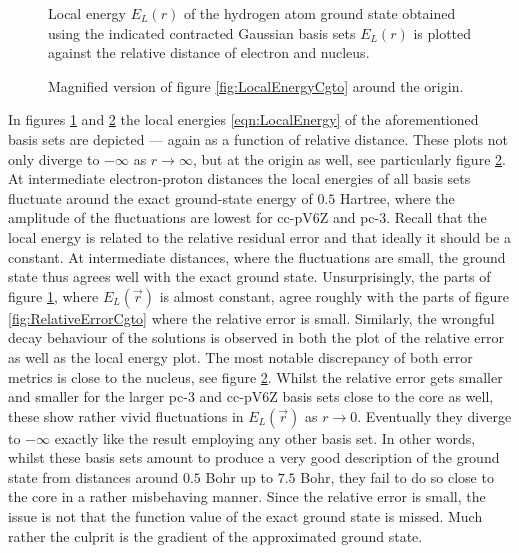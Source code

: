 \begin{figure}[p]
	\centering
	\caption[Local energy of the hydrogen \HF ground state for {\cGTO} bases]{
		Local energy $E_L(r)$ of the hydrogen atom \HF ground state
		obtained using the indicated contracted Gaussian basis sets
		$E_L(r)$ is plotted against the relative distance
		of electron and nucleus.
	}
	\label{fig:LocalEnergyCgto}
\end{figure}

\begin{figure}[p]
	\centering
	\caption[Local energy of the hydrogen \HF ground state for {\cGTO} bases (magnified)]{
		Magnified version of figure \vref{fig:LocalEnergyCgto}
		around the origin.
	}
	\label{fig:LocalEnergyCgtoZoom}
\end{figure}

In figures \ref{fig:LocalEnergyCgto} and \ref{fig:LocalEnergyCgtoZoom}
the local energies \eqref{eqn:LocalEnergy}
of the aforementioned basis sets are depicted
--- again as a function of relative distance.
These plots not only diverge to $-\infty$ as $r \to \infty$,
but at the origin as well, see particularly figure \ref{fig:LocalEnergyCgtoZoom}.
At intermediate electron-proton distances
the local energies of all basis sets
fluctuate around the exact ground-state energy of $0.5$ Hartree,
where the amplitude of the fluctuations are lowest for cc-pV6Z and pc-3.
Recall that the local energy is related to the relative residual error
and that ideally it should be a constant.
At intermediate distances, where the fluctuations are small,
the \HF ground state thus agrees well with the exact ground state.
Unsurprisingly, the parts of figure \ref{fig:LocalEnergyCgto},
where $E_L(\vec{r})$ is almost constant,
agree roughly with the parts of figure \ref{fig:RelativeErrorCgto}
where the relative error is small.
Similarly, the wrongful decay behaviour of the \cGTO solutions
is observed in both the plot of the relative error as well as
the local energy plot.
The most notable discrepancy of both error metrics
is close to the nucleus, see figure \ref{fig:LocalEnergyCgtoZoom}.
Whilst the relative error gets smaller and smaller for the larger
pc-3 and cc-pV6Z basis sets close to the core as well,
these show rather vivid fluctuations in $E_L(\vec{r})$ as $r \to 0$.
Eventually they diverge to $-\infty$ exactly like the result
employing any other basis set.
In other words, whilst these basis sets amount to produce
a very good description of the ground state from distances around
$0.5$ Bohr up to $7.5$ Bohr,
they fail to do so close to the core in a rather misbehaving manner.
Since the relative error is small,
the issue is not that the function value
of the exact ground state is missed.
Much rather the culprit is the gradient of the approximated
\HF ground state.


